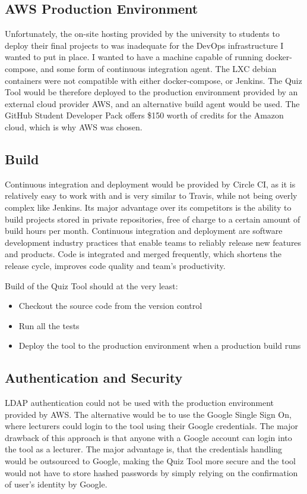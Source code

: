 \subsection{AWS Production Environment}
Unfortunately, the on-site hosting provided by the university to students to deploy
their final projects to was inadequate for the DevOps infrastructure I wanted to
put in place. I wanted to have a machine capable of running docker-compose, and some
form of continuous integration agent. The LXC debian containers\cite{22} were not
compatible with either docker-compose, or Jenkins\cite{23}. The Quiz Tool would be therefore
deployed to the production environment provided by an external cloud provider AWS\cite{24},
and an alternative build agent would be used. The GitHub Student Developer Pack\cite{25} offers
\$150 worth of credits for the Amazon cloud, which is why AWS was chosen.

\subsection{Build}
Continuous integration and deployment would be provided by Circle CI\cite{26}, as it is relatively easy
to work with and is very similar to Travis\cite{27}, while not being overly complex like Jenkins\cite{23}.
Its major advantage over its competitors is the ability to build projects stored in private
repositories, free of charge to a certain amount of build hours per month. Continuous integration
and deployment are software development industry practices that enable teams to reliably release
new features and products. Code is integrated and merged frequently, which shortens the release cycle,
improves code quality and team's productivity\cite{28}.

Build of the Quiz Tool should at the very least:
\begin{itemize}
  \item Checkout the source code from the version control
  \item Run all the tests
  \item Deploy the tool to the production environment when a production build runs
\end{itemize}

\subsection{Authentication and Security}
LDAP authentication could not be used with the production environment provided by
AWS. The alternative would be to use the Google Single Sign On\cite{2}, where lecturers
could login to the tool using their Google credentials. The major drawback of this
approach is that anyone with a Google account can login into the tool as a lecturer.
The major advantage is, that the credentials handling would be outsourced to Google,
making the Quiz Tool more secure and the tool would not have to store hashed passwords
by simply relying on the confirmation of user's identity by Google.


